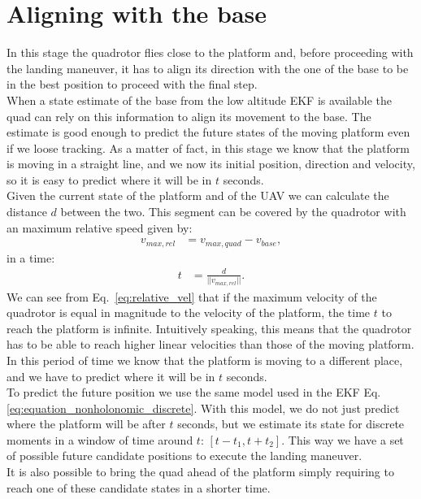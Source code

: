 \section{Aligning with the base}
In this stage the quadrotor flies close to the platform and, before proceeding with the landing maneuver, it has to align its direction with the one of the base to be in the best position to proceed with the final step.\\

When a state estimate of the base from the low altitude EKF is available the quad can rely on this information to align its movement to the base. The estimate is good enough to predict the future states of the moving platform even if we loose tracking. As a matter of fact, in this stage we know that the platform is moving in a straight line, and we now its initial position, direction and velocity, so it is easy to predict where it will be in $t$ seconds.\\

Given the current state of the platform and of the UAV we can calculate the distance $d$ between the two. This segment can be covered by the quadrotor with an maximum relative speed given by:
\begin{align}
v_{max,rel} &= v_{max,quad} - v_{base},
\label{eq:relative_vel}
\end{align}
in a time:
\begin{align}
t &= \frac{d}{||v_{max,rel}||}.
\end{align}
We can see from Eq.~\eqref{eq:relative_vel} that if the maximum velocity of the quadrotor  is equal in magnitude to the velocity of the platform, the time $t$ to reach the platform is infinite. Intuitively speaking, this means that the quadrotor has to be able to reach higher linear velocities than those of the moving platform.\\

In this period of time we know that the platform is moving to a different place, and we have to predict where it will be in $t$ seconds.\\
To predict the future position we use the same model used in the EKF Eq.\eqref{eq:equation_nonholonomic_discrete}. With this model, we do not just predict where the platform will be after $t$ seconds, but we estimate its state for discrete moments in a window of time around $t$: $[t-t_1,t+t_2]$. This way we have a set of possible future candidate positions to execute the landing maneuver.\\
It is also possible to bring the quad ahead of the platform simply requiring to reach one of these candidate states in a shorter time.\\

